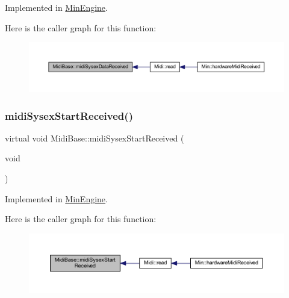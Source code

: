 Implemented in \hyperlink{class_min_engine_ac424a71b7b8e28ce4e6cd47bda488704}{Min\+Engine}.

Here is the caller graph for this function\+:
\nopagebreak
\begin{figure}[H]
\begin{center}
\leavevmode
\includegraphics[width=350pt]{class_midi_base_ade00871c0c9e32bfacf34480faf0d37b_icgraph}
\end{center}
\end{figure}
\mbox{\label{class_midi_base_a3b3e70e61a2f2fa169bf694eeefeb0fd}} 
\subsubsection{\texorpdfstring{midi\+Sysex\+Start\+Received()}{midiSysexStartReceived()}}
{\footnotesize\ttfamily virtual void Midi\+Base\+::midi\+Sysex\+Start\+Received (\begin{DoxyParamCaption}\item[{void}]{ }\end{DoxyParamCaption})\hspace{0.3cm}{\ttfamily [pure virtual]}}



Implemented in \hyperlink{class_min_engine_a79e4c141d7f6df522e5307195c8aeec0}{Min\+Engine}.

Here is the caller graph for this function\+:
\nopagebreak
\begin{figure}[H]
\begin{center}
\leavevmode
\includegraphics[width=350pt]{class_midi_base_a3b3e70e61a2f2fa169bf694eeefeb0fd_icgraph}
\end{center}
\end{figure}
\mbox{\label{class_midi_base_a14d11f47e731a26535f855a99893d092}} 
